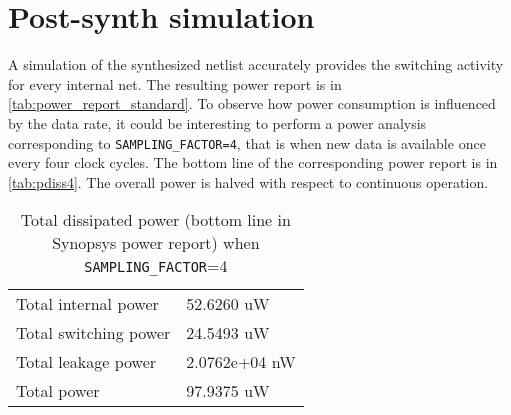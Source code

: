 \section{Post-synth simulation}

A simulation of the synthesized netlist accurately provides the switching activity for every internal net. The resulting power report is in \autoref{tab:power_report_standard}. To observe how power consumption is influenced by the data rate, it could be interesting to perform a power analysis corresponding to \texttt{SAMPLING\_FACTOR=4}, that is when new data is available once every four clock cycles. The bottom line of the corresponding power report is in \autoref{tab:pdiss4}. The overall power is halved with respect to continuous operation.
\begin{table}
	\centering
    \begin{tabular}{|l|l|}
        \hline
        Total internal power          &   52.6260 uW  \\
        Total switching power &      24.5493 uW \\
        Total leakage power &    2.0762e+04 nW    \\
        Total power &    97.9375 uW\\\hline
    \end{tabular}
    \caption{Total dissipated power (bottom line in Synopsys power report) when \texttt{SAMPLING\_FACTOR}=4}
    \label{tab:pdiss4}
\end{table}
